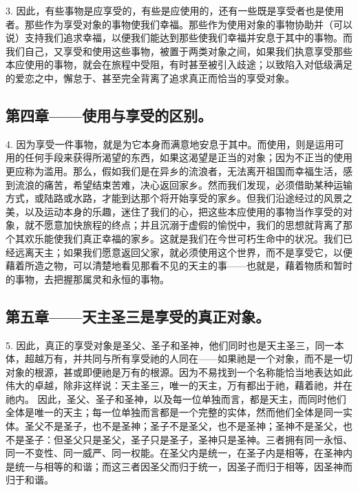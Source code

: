 3. 因此，有些事物是应享受的，有些是应使用的，还有一些既是享受者也是使用者。那些作为享受对象的事物使我们幸福。那些作为使用对象的事物协助并（可以说）支持我们追求幸福，以便我们能达到那些使我们幸福并安息于其中的事物。而我们自己，又享受和使用这些事物，被置于两类对象之间，如果我们执意享受那些本应使用的事物，就会在旅程中受阻，有时甚至被引入歧途；以致陷入对低级满足的爱恋之中，懈怠于、甚至完全背离了追求真正而恰当的享受对象。\par


\subsection{第四章——使用与享受的区别。}

4. 因为享受一件事物，就是为它本身而满意地安息于其中。而使用，则是运用可用的任何手段来获得所渴望的东西，如果这渴望是正当的对象；因为不正当的使用更应称为滥用。那么，假如我们是在异乡的流浪者，无法离开祖国而幸福生活，感到流浪的痛苦，希望结束苦难，决心返回家乡。然而我们发现，必须借助某种运输方式，或陆路或水路，才能到达那个将开始享受的家乡。但我们沿途经过的风景之美，以及运动本身的乐趣，迷住了我们的心，把这些本应使用的事物当作享受的对象，就不愿意加快旅程的终点；并且沉溺于虚假的愉悦中，我们的思想就背离了那个其欢乐能使我们真正幸福的家乡。这就是我们在今世可朽生命中的状况。我们已经远离天主；如果我们愿意返回父家，就必须使用这个世界，而不是享受它，以便藉着所造之物，可以清楚地看见那看不见的天主的事——也就是，藉着物质和暂时的事物，去把握那属灵和永恒的事物。\par


\subsection{第五章——天主圣三是享受的真正对象。}

5. 因此，真正的享受对象是圣父、圣子和圣神，他们同时也是天主圣三，同一本体，超越万有，并共同与所有享受祂的人同在——如果祂是一个对象，而不是一切对象的根源，甚或即便祂是万有的根源。因为不易找到一个名称能恰当地表达如此伟大的卓越，除非这样说：天主圣三，唯一的天主，万有都出于祂，藉着祂，并在祂内。 因此，圣父、圣子和圣神，以及每一位单独而言，都是天主，而同时他们全体是唯一的天主；每一位单独而言都是一个完整的实体，然而他们全体是同一实体。圣父不是圣子，也不是圣神；圣子不是圣父，也不是圣神；圣神不是圣父，也不是圣子：但圣父只是圣父，圣子只是圣子，圣神只是圣神。三者拥有同一永恒、同一不变性、同一威严、同一权能。在圣父内是统一，在圣子内是相等，在圣神内是统一与相等的和谐；而这三者因圣父而归于统一，因圣子而归于相等，因圣神而归于和谐。\par

